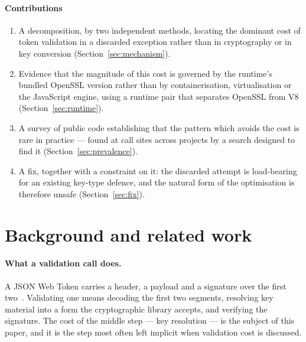 \documentclass[pdflatex,sn-basic,twocolumn]{sn-jnl}
\begin{document}
\paragraph{Contributions}
\begin{enumerate}
\item A decomposition, by two independent methods, locating the dominant cost of
      token validation in a discarded exception rather than in cryptography or
      in key conversion (Section~\ref{sec:mechanism}).
\item Evidence that the magnitude of this cost is governed by the runtime's
      bundled OpenSSL version rather than by containerisation, virtualisation or
      the JavaScript engine, using a runtime pair that separates OpenSSL from V8
      (Section~\ref{sec:runtime}).
\item A survey of public code establishing that the pattern which avoids the
      cost is rare in practice --- found at \AdjudicatedGenuine{} call sites
      across \AdjudicatedGenuineProjects{} projects by a search designed to
      find it (Section~\ref{sec:prevalence}).
\item A fix, together with a constraint on it: the discarded attempt is
      load-bearing for an existing key-type defence, and the natural form of the
      optimisation is therefore unsafe (Section~\ref{sec:fix}).
\end{enumerate}

\section{Background and related work}\label{sec:related}

\paragraph{What a validation call does.} A JSON Web Token carries a header, a
payload and a signature over the first two~\cite{rfc7519}. Validating one means
decoding the first two segments, resolving key material into a form the
cryptographic library accepts, and verifying the signature. The cost of the
middle step --- key resolution --- is the subject of this paper, and it is the
step most often left implicit when validation cost is discussed.
\end{document}
